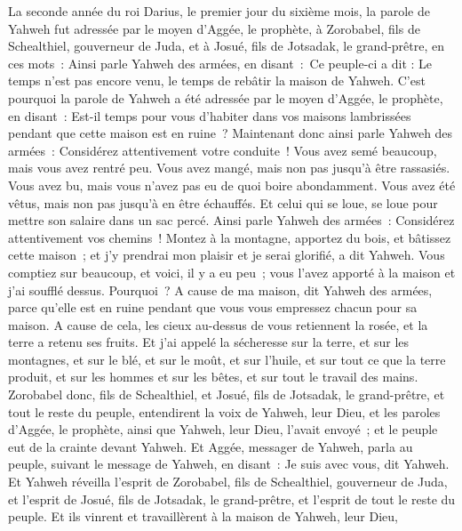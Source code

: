 \begin{multicols}{2}
\VerseOne{}La seconde année du roi Darius, le premier jour du sixième mois, la parole de Yahweh fut adressée par le moyen d'Aggée, le prophète, à Zorobabel, fils de Schealthiel, gouverneur de Juda, et à Josué, fils de Jotsadak, le grand-prêtre, en ces mots~:
Ainsi parle Yahweh des armées, en disant~:~Ce peuple-ci a dit : Le temps n'est pas encore venu, le temps de rebâtir la maison de Yahweh.
C'est pourquoi la parole de Yahweh a été adressée par le moyen d'Aggée, le prophète, en disant~:
Est-il temps pour vous d'habiter dans vos maisons lambrissées pendant que cette maison est en ruine~?
Maintenant donc ainsi parle Yahweh des armées~: Considérez attentivement votre conduite~!
Vous avez semé beaucoup, mais vous avez rentré peu. Vous avez mangé, mais non pas jusqu'à être rassasiés. Vous avez bu, mais vous n'avez pas eu de quoi boire abondamment. Vous avez été vêtus, mais non pas jusqu'à en être échauffés. Et celui qui se loue, se loue pour mettre son salaire dans un sac percé.
Ainsi parle Yahweh des armées~: Considérez attentivement vos chemins~!
Montez à la montagne, apportez du bois, et bâtissez cette maison~; et j'y prendrai mon plaisir et je serai glorifié, a dit Yahweh.
Vous comptiez sur beaucoup, et voici, il y a eu peu~; vous l'avez apporté à la maison et j'ai soufflé dessus. Pourquoi~? A cause de ma maison, dit Yahweh des armées, parce qu'elle est en ruine pendant que vous vous empressez chacun pour sa maison.
A cause de cela, les cieux au-dessus de vous retiennent la rosée, et la terre a retenu ses fruits.
Et j'ai appelé la sécheresse sur la terre, et sur les montagnes, et sur le blé, et sur le moût, et sur l'huile, et sur tout ce que la terre produit, et sur les hommes et sur les bêtes, et sur tout le travail des mains.
Zorobabel donc, fils de Schealthiel, et Josué, fils de Jotsadak, le grand-prêtre, et tout le reste du peuple, entendirent la voix de Yahweh, leur Dieu, et les paroles d'Aggée, le prophète, ainsi que Yahweh, leur Dieu, l'avait envoyé~; et le peuple eut de la crainte devant Yahweh.
Et Aggée, messager de Yahweh, parla au peuple, suivant le message de Yahweh, en disant~: Je suis avec vous, dit Yahweh.
Et Yahweh réveilla l'esprit de Zorobabel, fils de Schealthiel, gouverneur de Juda, et l'esprit de Josué, fils de Jotsadak, le grand-prêtre, et l'esprit de tout le reste du peuple. Et ils vinrent et travaillèrent à la maison de Yahweh, leur Dieu,

\end{multicols}
